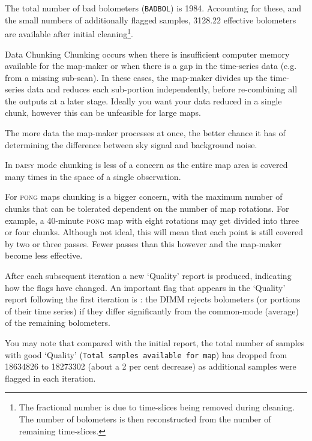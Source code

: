 \documentclass[11pt,oneside,chapters]{starlink}
\begin{document}
The total number of bad bolometers (\texttt{BADBOL}) is 1984.
Accounting for these, and the small numbers of additionally flagged
samples, 3128.22 effective bolometers are available after initial
cleaning\footnote{The fractional number is due to time-slices being
removed during cleaning. The number of bolometers is then
reconstructed from the number of remaining time-slices.}.


\begin{sltextbox}{Data Chunking}
  \label{box:chunk}
  Chunking occurs when there is insufficient computer memory available
  for the map-maker or when there is a gap in the time-series data
  (e.g.  from a missing sub-scan). In these cases, the map-maker
  divides up the time-series data and reduces each sub-portion
  independently, before re-combining all the outputs at a later
  stage. Ideally you want your data reduced in a single chunk, however
  this can be unfeasible for large maps.

  The more data the map-maker processes at once, the better chance it
  has of determining the difference between sky signal and background
  noise.

  In \textsc{daisy} mode chunking is less of a concern as the entire
  map area is covered many times in the space of a single observation.
  
  For \textsc{pong} maps chunking is a bigger concern, with the
  maximum number of chunks that can be tolerated dependent on the
  number of map rotations. For example, a 40-minute \textsc{pong} map
  with eight rotations may get divided into three or four
  chunks. Although not ideal, this will mean that each point is still
  covered by two or three passes. Fewer passes than this however and
  the map-maker become less effective.
\end{sltextbox}

After each subsequent iteration a new `Quality' report is produced,
indicating how the flags have changed. An important flag that appears
in the `Quality' report following the first iteration is :
the DIMM rejects bolometers (or portions of their time series) if they
differ significantly from the common-mode (average) of the remaining
bolometers.

You may note that compared with the initial report, the total number
of samples with good `Quality' (\texttt{Total samples available for
  map}) has dropped from 18634826 to 18273302 (about a 2 per cent
decrease) as additional samples were flagged in each iteration.
\end{document}
